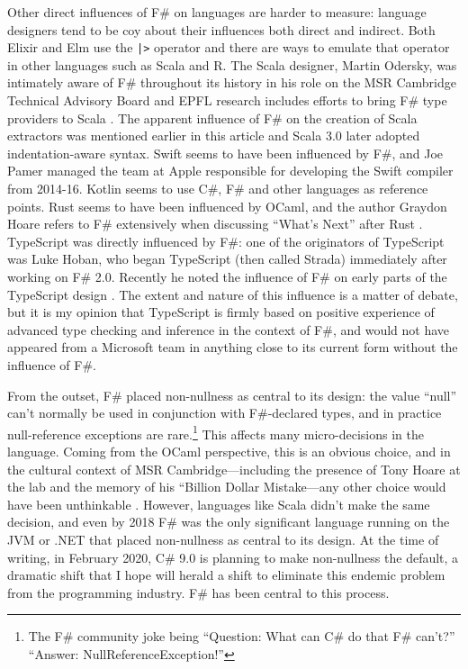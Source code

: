 \documentclass[acmsmall,screen]{acmart}
\begin{document}
Other direct influences of F\# on languages are harder to measure: language designers tend to be coy about their
influences both direct and indirect. Both Elixir and Elm use the \texttt{|>} operator and there are ways to emulate that operator
in other languages such as Scala and R. The Scala designer, Martin Odersky, was intimately aware of F\# throughout
its history in his role on the MSR Cambridge Technical Advisory Board and EPFL research includes efforts to
bring F\# type providers to Scala \citep{Burmako2013}.  The apparent influence of F\# on the
creation of Scala extractors was mentioned earlier in this article and Scala 3.0 later adopted indentation-aware 
syntax. Swift seems to have been influenced
by F\#, and Joe Pamer managed the team at Apple responsible for developing the Swift compiler from 2014-16.
Kotlin seems to use C\#, F\# and other languages as reference points.  Rust seems to have been
influenced by OCaml, and the author Graydon Hoare refers to F\# extensively when discussing “What’s Next” after
Rust \citep{RefGraydon}.
TypeScript was directly influenced by F\#: one of the originators of TypeScript was
Luke Hoban, who began TypeScript (then called Strada) immediately after working on F\# 2.0. Recently
he noted the influence of F\# on early parts of the TypeScript
design \citep{RefTypeScriptDemo}. The
extent and nature of this influence is a matter of debate, but it is my opinion that TypeScript is firmly based on positive experience of advanced type checking and inference
in the context of F\#, and would not have appeared from a Microsoft team in anything close to its current form without the influence of F\#.

From the outset, F\# placed non-nullness as central to its design: the value “null” can’t normally be used in conjunction
with F\#-declared types, and in practice null-reference exceptions are rare.\footnote{The F\# community joke being “Question: What can C\# do that F\# can’t?” “Answer: NullReferenceException!”}   This affects many micro-decisions in the
language. Coming from the OCaml perspective, this is an obvious choice, and in the cultural context of MSR
Cambridge---including the presence of Tony Hoare at the lab and the memory of his “Billion Dollar Mistake---any
other choice would have been unthinkable \citep{HoareNulls2011}.  However, languages like Scala didn’t make the same
decision, and even by 2018 F\# was the only significant language running on the JVM or .NET that placed non-nullness
as central to its design. At the time of writing, in February 2020, C\# 9.0 is planning to make non-nullness the
default, a dramatic shift that I hope will herald a shift to eliminate this endemic problem from the programming industry. F\# has been central to this process.
\end{document}
